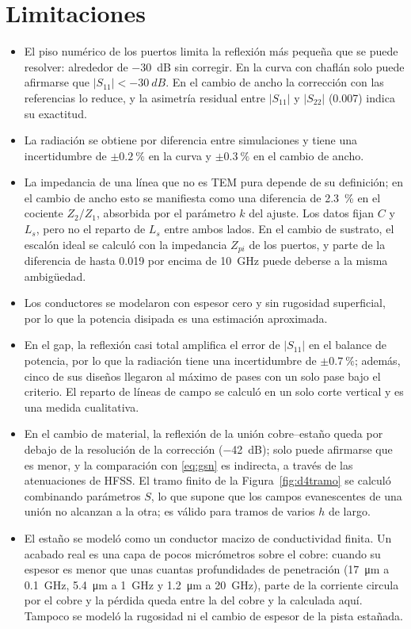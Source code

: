 \documentclass[11pt,letterpaper]{article}
\begin{document}
\section{Limitaciones}
\begin{itemize}
\item El piso numérico de los puertos limita la reflexión más pequeña que se puede resolver: alrededor de $-30$~dB sin corregir. En la curva con chaflán solo puede afirmarse que $|S_{11}|<\SI{-30}{dB}$. En el cambio de ancho la corrección con las referencias lo reduce, y la asimetría residual entre $|S_{11}|$ y $|S_{22}|$ (0.007) indica su exactitud.
\item La radiación se obtiene por diferencia entre simulaciones y tiene una incertidumbre de $\pm\SI{0.2}{\percent}$ en la curva y $\pm\SI{0.3}{\percent}$ en el cambio de ancho.
\item La impedancia de una línea que no es TEM pura depende de su definición; en el cambio de ancho esto se manifiesta como una diferencia de \SI{2.3}{\percent} en el cociente $Z_2/Z_1$, absorbida por el parámetro $k$ del ajuste. Los datos fijan $C$ y $L_s$, pero no el reparto de $L_s$ entre ambos lados. En el cambio de sustrato, el escalón ideal se calculó con la impedancia $Z_{pi}$ de los puertos, y parte de la diferencia de hasta 0.019 por encima de \SI{10}{GHz} puede deberse a la misma ambigüedad.
\item Los conductores se modelaron con espesor cero y sin rugosidad superficial, por lo que la potencia disipada es una estimación aproximada.
\item En el gap, la reflexión casi total amplifica el error de $|S_{11}|$ en el balance de potencia, por lo que la radiación tiene una incertidumbre de $\pm\SI{0.7}{\percent}$; además, cinco de sus diseños llegaron al máximo de pases con un solo pase bajo el criterio. El reparto de líneas de campo se calculó en un solo corte vertical y es una medida cualitativa.
\item En el cambio de material, la reflexión de la unión cobre--estaño queda por debajo de la resolución de la corrección (\SI{-42}{dB}); solo puede afirmarse que es menor, y la comparación con \eqref{eq:gsn} es indirecta, a través de las atenuaciones de HFSS. El tramo finito de la Figura~\ref{fig:d4tramo} se calculó combinando parámetros $S$, lo que supone que los campos evanescentes de una unión no alcanzan a la otra; es válido para tramos de varios $h$ de largo.
\item El estaño se modeló como un conductor macizo de conductividad finita. Un acabado real es una capa de pocos micrómetros sobre el cobre: cuando su espesor es menor que unas cuantas profundidades de penetración (\SI{17}{\micro\metre} a \SI{0.1}{GHz}, \SI{5.4}{\micro\metre} a \SI{1}{GHz} y \SI{1.2}{\micro\metre} a \SI{20}{GHz}), parte de la corriente circula por el cobre y la pérdida queda entre la del cobre y la calculada aquí. Tampoco se modeló la rugosidad ni el cambio de espesor de la pista estañada.

\end{itemize}
\end{document}
